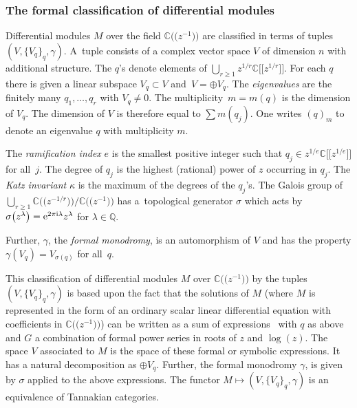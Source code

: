 \documentclass[pdftex]{sigma}
\numberwithin{equation}{section}
\begin{document}
\subsubsection{The formal classification of differential modules}

Differential modules $M$ over the field $\mathbb{C}\bigl( \!\bigl(z^{-1}\bigr)\!\bigr)$ are classified
in terms of tuples $(V, \{V_q\}_q, \gamma)$. A~tuple consists of a complex vector space $V$ of dimension $n$ with additional structure.
The $q$'s denote elements of $ \bigcup_{r\geq 1} z^{1/r}\mathbb{C}\bigl[\!\bigl[z^{1/r}\bigr]\!\bigr]$. For each $q$ there is given a linear
subspace $V_q\subset V$ and~${V=\oplus V_q}$. The {\it eigenvalues } are the finitely many $q_1,\dots ,q_r$ with $V_{q}\neq 0$.
The multiplicity~${m=m(q)}$ is the dimension of $V_q$. The dimension of $V$ is therefore equal to $\sum m(q_j)$.
One writes $(q)_m$ to denote an eigenvalue $q$ with multiplicity $m$.

The {\it ramification index} $e$ is the smallest positive integer such that $q_j\in z^{1/e}\mathbb{C}\bigl[\!\bigl[z^{1/e}\bigr]\!\bigr]$ for all~$j$. The degree of
$q_j$ is the highest (rational) power of $z$ occurring in $q_j$. The {\it Katz invariant} $\kappa$ is the maximum
of the degrees of the $q_j$'s. The Galois group of $\bigcup_{r\geq 1}\mathbb{C}\bigl(\!\bigl( z^{-1/r}\bigr)\!\bigr)/ \mathbb{C}\bigl(\!\bigl(z^{-1}\bigr)\!\bigr)$ has a~topological generator $\sigma$ which acts by $\sigma \bigl(z^\lambda\bigr)={\rm e}^{2\pi {\rm i} \lambda}z^\lambda$ for $\lambda \in \mathbb{Q}$.

Further, $\gamma$, the {\it formal monodromy}, is an automorphism of $V$ and has the property
$\gamma (V_q)=V_{\sigma(q)}$ for all~$q$.

This classification of differential modules $M$ over $\mathbb{C}\bigl(\!\bigl(z^{-1}\bigr)\!\bigr)$
 by the tuples $(V,\{V_q\}_q,\gamma)$ is based upon the fact that the solutions of $M$ \big(where $M$ is represented in the form of an ordinary
 scalar linear differential equation with coefficients in $\mathbb{C}\bigl(\!\bigl(z^{-1}\bigr)\!\bigr)$\big) \color{black} can be written as a sum of
 expressions~ with $q$ as above and $G$ a combination of formal power series
 in roots of $z$ and $\log (z)$. The space $V$ associated to $M$ is the space of these formal or symbolic expressions. It has a natural decomposition
 as $\oplus V_q$. Further, the formal monodromy $\gamma$, is given by $\sigma$ applied to the above expressions.
The functor $M\mapsto (V, \{V_q\}_q, \gamma)$ is an equivalence of Tannakian categories.
\end{document}

